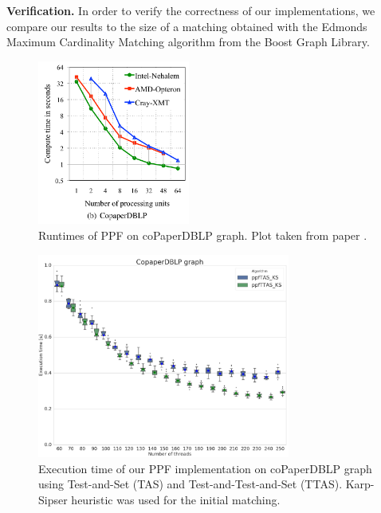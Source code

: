 \documentclass[letterpaper]{article}
\newcommand{\mypar}[1]{{\bf #1.}}
\begin{document}
\mypar{Verification}
In order to verify the correctness of our implementations, we compare our results to the size of a matching obtained with the Edmonds Maximum Cardinality Matching algorithm \cite{BoostEdmonds} from the Boost Graph Library.\\


\begin{figure}\centering
	\includegraphics[width=5cm]{../../plot/output/report/coPaperAzadPlot.png}
    \caption{Runtimes of PPF on coPaperDBLP graph. Plot taken from paper \cite{Azad:2012}.}
	\label{fig:azadCopaper}
\end{figure}


\begin{figure}\centering
	\includegraphics[width=8.3cm]{../../plot/output/report/coPaperDBLP_PPFTASvsPPFTTAS.png}
    \caption{Execution time of our PPF implementation on coPaperDBLP graph using Test-and-Set (TAS) and Test-and-Test-and-Set (TTAS). Karp-Sipser heuristic was used for the initial matching.}
	\label{fig:tasvsttas}
\end{figure}
\end{document}
